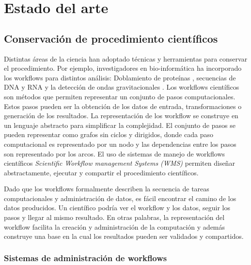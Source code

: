 \chapter{Estado del arte}\label{Chapter2} 
\section{Conservación de procedimiento científicos}

Distintas áreas de la ciencia han adoptado técnicas y herramientas para conservar el procedimiento. Por ejemplo, investigadores en bio-informática ha incorporado los workflows para distintos análisis:  Doblamiento de proteínas \cite{craddock2006science}, secuencias de DNA y RNA \cite{blankenberg2010galaxy,giardine2005galaxy} y la detección de ondas gravitacionales \cite{deelman2004pegasus}.
Los workflows científicos son métodos que permiten representar un conjunto de pasos computacionales. Estos pasos pueden ser la obtención de los datos de entrada, transformaciones o generación de los resultados.
La representación de los workflow se construye en un lenguaje abstracto para simplificar la complejidad. El conjunto de pasos se pueden representar como grafos sin ciclos y dirigidos, donde cada paso computacional es representado por un nodo y las dependencias entre los pasos son representado por los arcos.
El uso de sistemas de manejo de workflows científicos \textit{Scientific Workflow management Systems (WMS)} permiten diseñar abstractamente, ejecutar y compartir el procedimiento científicos. 

Dado que los workflows formalmente describen la secuencia de tareas computacionales y administración de datos, es fácil encontrar el camino de los datos producidos.
Un científico podría ver el workflow y los datos, seguir los pasos y llegar al mismo resultado. En otras palabras, la representación del workflow facilita la creación y administración de la computación y además construye una base en la cual los resultados pueden ser validados y compartidos.


\subsection{Sistemas de administración de workflows}

